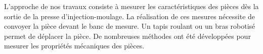 %
%
%
%
%
%
%
L'approche de nos travaux consiste à mesurer les caractéristiques des pièces dès la sortie de la presse d'injection-moulage.
La réalisation de ces mesures nécessite de convoyer la pièce devant le banc de mesure.
Un tapis roulant ou un bras robotisé permet de déplacer la pièce.
De nombreuses méthodes ont été développées pour mesurer les propriétés mécaniques des pièces.

